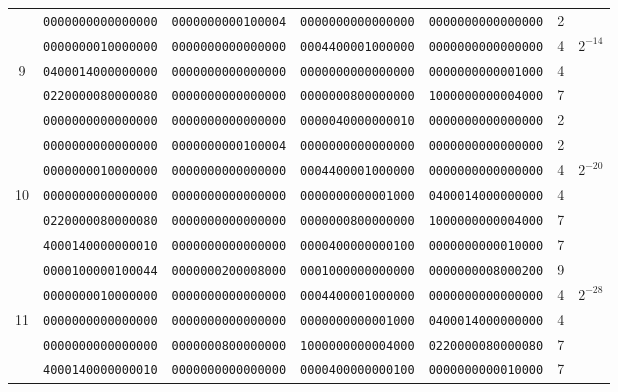 \begin{table}[!tb]
\begin{center}
{\begin{tabular}{ccccccc}
      & {\tt 0000000000000000} & {\tt 0000000000100004} & {\tt 0000000000000000} & {\tt 0000000000000000} & 2  & \\
      & {\tt 0000000010000000} & {\tt 0000000000000000} & {\tt 0004400001000000} & {\tt 0000000000000000} & 4  & \multirow{3}{*}{$2^{-14}$}\\
9     & {\tt 0400014000000000} & {\tt 0000000000000000} & {\tt 0000000000000000} & {\tt 0000000000001000} & 4  & \\
      & {\tt 0220000080000080} & {\tt 0000000000000000} & {\tt 0000000800000000} & {\tt 1000000000004000} & 7  & \\
      & {\tt 0000000000000000} & {\tt 0000000000000000} & {\tt 0000040000000010} & {\tt 0000000000000000} & 2  & \\ \hline

      & {\tt 0000000000000000} & {\tt 0000000000100004} & {\tt 0000000000000000} & {\tt 0000000000000000} & 2  & \\
      & {\tt 0000000010000000} & {\tt 0000000000000000} & {\tt 0004400001000000} & {\tt 0000000000000000} & 4  & \multirow{3}{*}{$2^{-20}$}\\
10    & {\tt 0000000000000000} & {\tt 0000000000000000} & {\tt 0000000000001000} & {\tt 0400014000000000} & 4  & \\
      & {\tt 0220000080000080} & {\tt 0000000000000000} & {\tt 0000000800000000} & {\tt 1000000000004000} & 7  & \\
      & {\tt 4000140000000010} & {\tt 0000000000000000} & {\tt 0000400000000100} & {\tt 0000000000010000} & 7  & \\ \hline

      & {\tt 0000100000100044} & {\tt 0000000200008000} & {\tt 0001000000000000} & {\tt 0000000008000200} & 9  & \\
      & {\tt 0000000010000000} & {\tt 0000000000000000} & {\tt 0004400001000000} & {\tt 0000000000000000} & 4  &\multirow{3}{*}{$2^{-28}$} \\
11    & {\tt 0000000000000000} & {\tt 0000000000000000} & {\tt 0000000000001000} & {\tt 0400014000000000} & 4  & \\
      & {\tt 0000000000000000} & {\tt 0000000800000000} & {\tt 1000000000004000} & {\tt 0220000080000080} & 7  & \\
      & {\tt 4000140000000010} & {\tt 0000000000000000} & {\tt 0000400000000100} & {\tt 0000000000010000} & 7  & \\ \hline


\end{tabular}}
\end{center}
\end{table}
